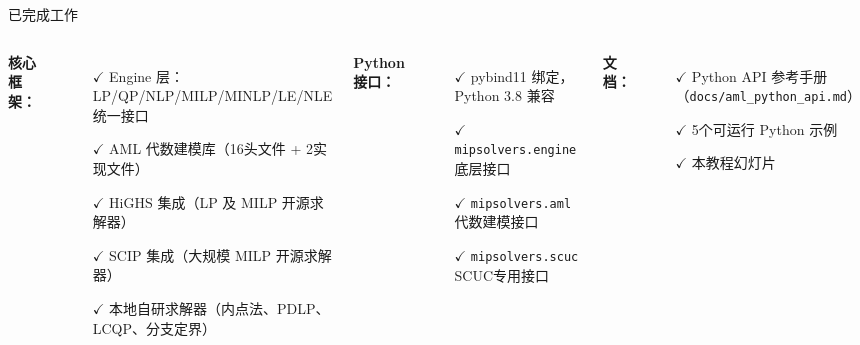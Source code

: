 \documentclass[10pt,aspectratio=169]{beamer}
\begin{document}
\begin{frame}{已完成工作}
  \begin{columns}[T]
    \textbf{核心框架：}
    \begin{itemize}
      \item[$\checkmark$] Engine 层：LP/QP/NLP/MILP/MINLP/LE/NLE 统一接口
      \item[$\checkmark$] AML 代数建模库（16头文件 + 2实现文件）
      \item[$\checkmark$] HiGHS 集成（LP 及 MILP 开源求解器）
      \item[$\checkmark$] SCIP 集成（大规模 MILP 开源求解器）
      \item[$\checkmark$] 本地自研求解器（内点法、PDLP、LCQP、分支定界）
    \end{itemize}

    \textbf{Python 接口：}
    \begin{itemize}
      \item[$\checkmark$] pybind11 绑定，Python 3.8 兼容
      \item[$\checkmark$] \texttt{mipsolvers.engine} 底层接口
      \item[$\checkmark$] \texttt{mipsolvers.aml} 代数建模接口
      \item[$\checkmark$] \texttt{mipsolvers.scuc} SCUC专用接口
    \end{itemize}

    \vspace{6pt}
    \textbf{文档：}
    \begin{itemize}
      \item[$\checkmark$] Python API 参考手册（\texttt{docs/aml\_python\_api.md}）
      \item[$\checkmark$] 5个可运行 Python 示例
      \item[$\checkmark$] 本教程幻灯片
    \end{itemize}
  \end{columns}
\end{frame}
\end{document}

